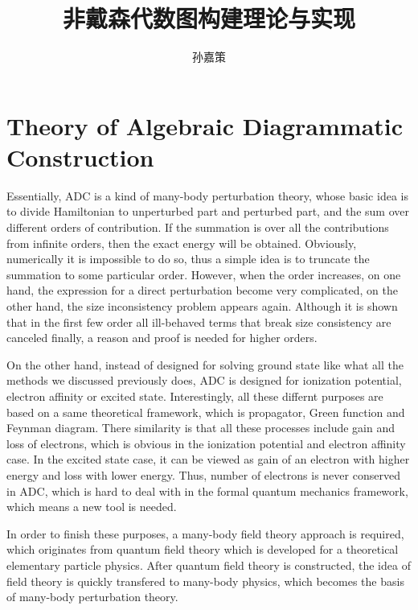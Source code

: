 \documentclass[bachelor, english]{ustcthesis}
\title{非戴森代数图构建理论与实现}
\author{孙嘉策}
\begin{document}
\maketitle
\makestatement

\frontmatter

\tableofcontents


\mainmatter


\chapter{Theory of Algebraic Diagrammatic Construction}

Essentially, ADC is a kind of many-body perturbation theory, whose basic idea is to divide Hamiltonian to unperturbed part and perturbed part, and the sum over different orders of contribution.
If the summation is over all the contributions from infinite orders, then the exact energy will be obtained.
Obviously, numerically it is impossible to do so, thus a simple idea is to truncate the summation to some particular order.
However, when the order increases, on one hand, the expression for a direct perturbation become very complicated, on the other hand, the size inconsistency problem appears again.
Although it is shown that in the first few order all ill-behaved terms that break size consistency are canceled finally, a reason and proof is needed for higher orders.

On the other hand, instead of designed for solving ground state like what all the methods we discussed previously does, ADC is designed for ionization potential, electron affinity or excited state.
Interestingly, all these differnt purposes are based on a same theoretical framework, which is propagator, Green function and Feynman diagram.
There similarity is that all these processes include gain and loss of electrons, which is obvious in the ionization potential and electron affinity case.
In the excited state case, it can be viewed as gain of an electron with higher energy and loss with lower energy.
Thus, number of electrons is never conserved in ADC, which is hard to deal with in the formal quantum mechanics framework, which means a new tool is needed.

In order to finish these purposes, a many-body field theory approach is required, which originates from quantum field theory which is developed for a theoretical elementary particle physics.
After quantum field theory is constructed, the idea of field theory is quickly transfered to many-body physics, which becomes the basis of many-body perturbation theory.
\end{document}
